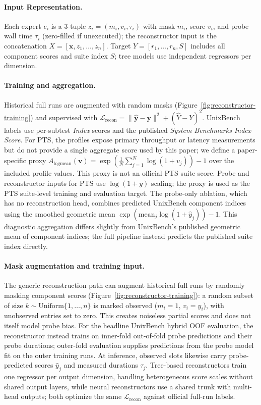 \documentclass[sigconf, review, anonymous, balance=false]{acmart}
\begin{document}
\paragraph{Input Representation.}
Each expert $e_i$ is a 3-tuple \(z_i = (m_i, v_i, \tau_i)\) with mask $m_i$, score $v_i$, and probe wall time $\tau_i$ (zero-filled if unexecuted); the reconstructor input is the concatenation \(X=[\mathbf{x},z_1,\ldots,z_n]\).
Target \(Y = [r_1, \ldots, r_n, S]\) includes all component scores and suite index $S$; tree models use independent regressors per dimension.

\paragraph{Training and aggregation.}
\label{subsec:aggregator}
Historical full runs are augmented with random masks (Figure~\ref{fig:reconstructor-training}) and supervised with $\mathcal{L}_{\mathrm{recon}}=\|\hat{\mathbf{y}}-\mathbf{y}\|^2+(\hat{Y}-Y)^2$.
UnixBench labels use per-subtest \emph{Index} scores and the published \emph{System Benchmarks Index Score}.
For PTS, the profiles expose primary throughput or latency measurements but do not provide a single aggregate score used by this paper; we define a paper-specific proxy \(A_{\mathrm{logmean}}(\mathbf{v})=\exp(\frac{1}{N}\sum_{j=1}^{N}\log(1+v_j))-1\) over the included profile values.
This proxy is not an official PTS suite score. Probe and reconstructor inputs for PTS use $\log(1+y)$ scaling; the proxy is used as the PTS suite-level training and evaluation target.
The probe-only ablation, which has no reconstruction head, combines predicted UnixBench component indices using the smoothed geometric mean \(\exp(\mathrm{mean}_j\log(1+\hat{y}_j))-1\). This diagnostic aggregation differs slightly from UnixBench's published geometric mean of component indices; the full pipeline instead predicts the published suite index directly.

\paragraph{Mask augmentation and training input.}
The generic reconstruction path can augment historical full runs by randomly masking component scores (Figure~\ref{fig:reconstructor-training}): a random subset of size $k \sim \mathrm{Uniform}\{1,\ldots,n\}$ is marked observed ($m_i{=}1$, $v_i{=}y_i$), with unobserved entries set to zero.
This creates noiseless partial scores and does not itself model probe bias.
For the headline UnixBench hybrid OOF evaluation, the reconstructor instead trains on inner-fold out-of-fold probe predictions and their probe durations; outer-fold evaluation supplies predictions from the probe model fit on the outer training runs.
At inference, observed slots likewise carry probe-predicted scores $\hat{y}_j$ and measured durations $\tau_j$.
Tree-based reconstructors train one regressor per output dimension, handling heterogeneous score scales without shared output layers, while neural reconstructors use a shared trunk with multi-head outputs; both optimize the same $\mathcal{L}_{\mathrm{recon}}$ against official full-run labels.
\end{document}
